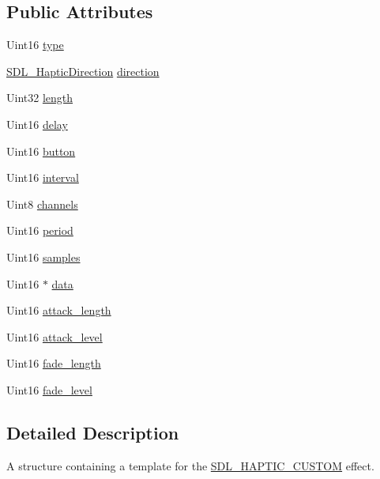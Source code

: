 \subsection*{Public Attributes}
\begin{DoxyCompactItemize}
\item 
Uint16 \hyperlink{structSDL__HapticCustom_a98a8995c94492069dc007502ed97eed2}{type}
\item 
\hyperlink{structSDL__HapticDirection}{S\+D\+L\+\_\+\+Haptic\+Direction} \hyperlink{structSDL__HapticCustom_ad7eb84f59404d9e0da07570b4b57dd43}{direction}
\item 
Uint32 \hyperlink{structSDL__HapticCustom_ad70e8bc2cff74b99d704a757c16b363f}{length}
\item 
Uint16 \hyperlink{structSDL__HapticCustom_a094229466ff4cf695860db664100a2b0}{delay}
\item 
Uint16 \hyperlink{structSDL__HapticCustom_aa4fbaf7220f3197aa6631b3e64ad6562}{button}
\item 
Uint16 \hyperlink{structSDL__HapticCustom_afdeb26b1709254545e00a59a0a6c360c}{interval}
\item 
Uint8 \hyperlink{structSDL__HapticCustom_a560215762e9096d583d75867d9227cf5}{channels}
\item 
Uint16 \hyperlink{structSDL__HapticCustom_aba7fafa808e90baddef25f009b8f4817}{period}
\item 
Uint16 \hyperlink{structSDL__HapticCustom_a5905ea1b6182da846535ca8c80b4fa33}{samples}
\item 
Uint16 $\ast$ \hyperlink{structSDL__HapticCustom_ad5a034f97e1699eacbe3f478538537c5}{data}
\item 
Uint16 \hyperlink{structSDL__HapticCustom_a018b35d89398c26e10d1fb4315d1dda1}{attack\+\_\+length}
\item 
Uint16 \hyperlink{structSDL__HapticCustom_ad6e394e3775372af3eb9e02823987405}{attack\+\_\+level}
\item 
Uint16 \hyperlink{structSDL__HapticCustom_ab47fac94baeba28a3acd6c706e0b6a5c}{fade\+\_\+length}
\item 
Uint16 \hyperlink{structSDL__HapticCustom_a73a522581eb514d032e500ec6294fe50}{fade\+\_\+level}
\end{DoxyCompactItemize}


\subsection{Detailed Description}
A structure containing a template for the \hyperlink{SDL__haptic_8h_a8a18c4de1076ac9bebd718329d16db29}{S\+D\+L\+\_\+\+H\+A\+P\+T\+I\+C\+\_\+\+C\+U\+S\+T\+OM} effect. 

